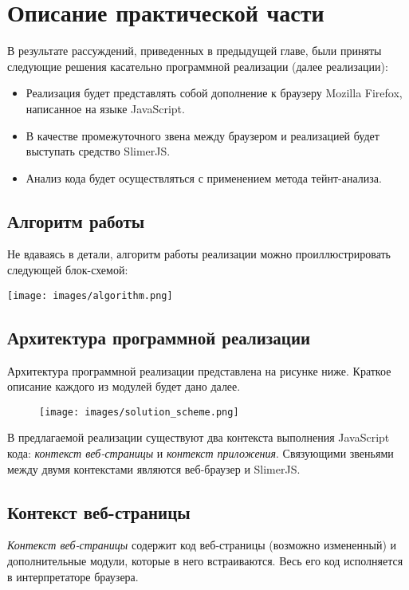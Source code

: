 
\chapter{Описание практической части}\label{Implementation}

В результате рассуждений, приведенных в предыдущей главе, были приняты следующие решения касательно программной реализации (далее реализации):

\begin{itemize}
	\item Реализация будет представлять собой дополнение к браузеру Mozilla Firefox, написанное на языке JavaScript.
	\item В качестве промежуточного звена между браузером и реализацией будет выступать средство SlimerJS.
	\item Анализ кода будет осуществляться с применением метода тейнт-анализа.
\end{itemize}

\section{Алгоритм работы}
Не вдаваясь в детали, алгоритм работы реализации можно проиллюстрировать следующей блок-схемой:

\texttt{[image: images/algorithm.png]}
\newpage


\section{Архитектура программной реализации}
Архитектура программной реализации представлена на рисунке ниже. Краткое описание каждого из модулей будет дано далее.

\bigskip
\begin{figure}[h]
	\texttt{[image: images/solution\_scheme.png]}
\end{figure}
\bigskip

В предлагаемой реализации существуют два контекста выполнения JavaScript кода: \textit{контекст веб-страницы} и \textit{контекст приложения}. Связующими звеньями между двумя контекстами являются веб-браузер и SlimerJS.

\section{Контекст веб-страницы}
\textit{Контекст веб-страницы} содержит код веб-страницы (возможно измененный) и дополнительные модули, которые в него встраиваются. Весь его код исполняется в интерпретаторе браузера. 

